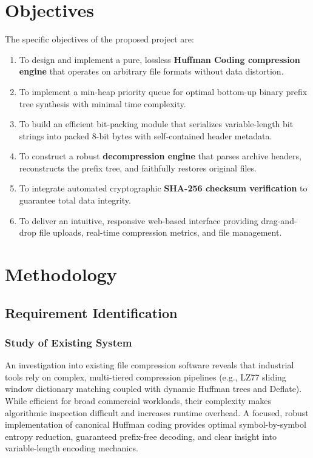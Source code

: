 \documentclass[12pt,a4paper]{article}
\begin{document}
\section{Objectives}

The specific objectives of the proposed project are:
\begin{enumerate}
    \item To design and implement a pure, lossless \textbf{Huffman Coding compression engine} that operates on arbitrary file formats without data distortion.
    \item To implement a min-heap priority queue for optimal bottom-up binary prefix tree synthesis with minimal time complexity.
    \item To build an efficient bit-packing module that serializes variable-length bit strings into packed 8-bit bytes with self-contained header metadata.
    \item To construct a robust \textbf{decompression engine} that parses archive headers, reconstructs the prefix tree, and faithfully restores original files.
    \item To integrate automated cryptographic \textbf{SHA-256 checksum verification} to guarantee total data integrity.
    \item To deliver an intuitive, responsive web-based interface providing drag-and-drop file uploads, real-time compression metrics, and file management.
\end{enumerate}

\section{Methodology}

\subsection{Requirement Identification}

\subsubsection{Study of Existing System}
An investigation into existing file compression software reveals that industrial tools rely on complex, multi-tiered compression pipelines (e.g., LZ77 sliding window dictionary matching coupled with dynamic Huffman trees and Deflate). While efficient for broad commercial workloads, their complexity makes algorithmic inspection difficult and increases runtime overhead. A focused, robust implementation of canonical Huffman coding provides optimal symbol-by-symbol entropy reduction, guaranteed prefix-free decoding, and clear insight into variable-length encoding mechanics.
\end{document}
